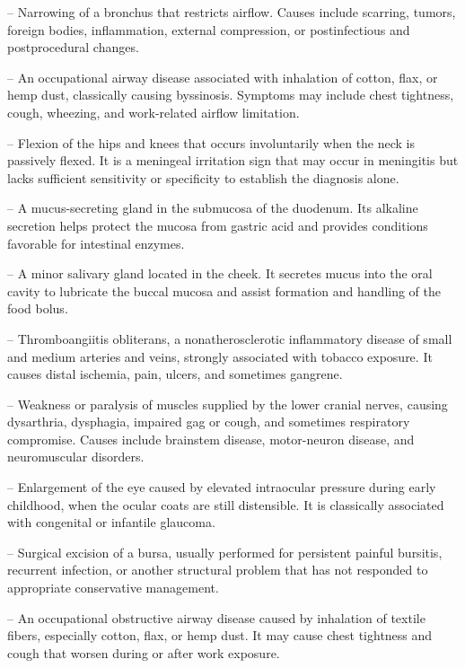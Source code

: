 -- Narrowing of a bronchus that restricts airflow. Causes include scarring, tumors, foreign bodies, inflammation, external compression, or postinfectious and postprocedural changes.

-- An occupational airway disease associated with inhalation of cotton, flax, or hemp dust, classically causing byssinosis. Symptoms may include chest tightness, cough, wheezing, and work-related airflow limitation.

-- Flexion of the hips and knees that occurs involuntarily when the neck is passively flexed. It is a meningeal irritation sign that may occur in meningitis but lacks sufficient sensitivity or specificity to establish the diagnosis alone.


-- A mucus-secreting gland in the submucosa of the duodenum. Its alkaline secretion helps protect the mucosa from gastric acid and provides conditions favorable for intestinal enzymes.

-- A minor salivary gland located in the cheek. It secretes mucus into the oral cavity to lubricate the buccal mucosa and assist formation and handling of the food bolus.

-- Thromboangiitis obliterans, a nonatherosclerotic inflammatory disease of small and medium arteries and veins, strongly associated with tobacco exposure. It causes distal ischemia, pain, ulcers, and sometimes gangrene.

-- Weakness or paralysis of muscles supplied by the lower cranial nerves, causing dysarthria, dysphagia, impaired gag or cough, and sometimes respiratory compromise. Causes include brainstem disease, motor-neuron disease, and neuromuscular disorders.

-- Enlargement of the eye caused by elevated intraocular pressure during early childhood, when the ocular coats are still distensible. It is classically associated with congenital or infantile glaucoma.

-- Surgical excision of a bursa, usually performed for persistent painful bursitis, recurrent infection, or another structural problem that has not responded to appropriate conservative management.

-- An occupational obstructive airway disease caused by inhalation of textile fibers, especially cotton, flax, or hemp dust. It may cause chest tightness and cough that worsen during or after work exposure.

